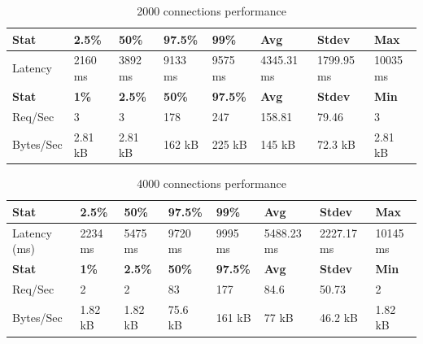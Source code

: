 \documentclass[../Main.tex]{subfiles}
\begin{document}
\begin{table}[H]
\centering
\begin{tabular}{|l|l|l|l|l|l|l|l|}
\hline
\rowcolor[HTML]{f56b00}
\textbf{Stat} & \textbf{2.5\%} & \textbf{50\%} & \textbf{97.5\%} & \textbf{99\%} & \textbf{Avg} & \textbf{Stdev} & \textbf{Max} \\ \hline
Latency & 2160 ms & 3892 ms & 9133 ms & 9575 ms & 4345.31 ms & 1799.95 ms & 10035 ms \\ \hline
\rowcolor[HTML]{f56b00}
\textbf{Stat} & \textbf{1\%} & \textbf{2.5\%} & \textbf{50\%} & \textbf{97.5\%} & \textbf{Avg} & \textbf{Stdev} & \textbf{Min} \\ \hline
Req/Sec & 3 & 3 & 178 & 247 & 158.81 & 79.46 & 3 \\ \hline
Bytes/Sec & 2.81 kB & 2.81 kB & 162 kB & 225 kB & 145 kB & 72.3 kB & 2.81 kB \\ \hline
\end{tabular}
 \caption{2000 connections performance}
 \label{2000-connections-performance}
\end{table}

\begin{table}[H]
  \centering
\begin{tabular}{|l|l|l|l|l|l|l|l|}
\hline
\rowcolor[HTML]{f56b00}
\textbf{Stat} & \textbf{2.5\%} & \textbf{50\%} & \textbf{97.5\%} & \textbf{99\%} & \textbf{Avg} & \textbf{Stdev} & \textbf{Max} \\ \hline
Latency (ms) & 2234 ms & 5475 ms & 9720 ms & 9995 ms & 5488.23 ms & 2227.17 ms & 10145 ms \\ \hline
\rowcolor[HTML]{f56b00}
\textbf{Stat} & \textbf{1\%} & \textbf{2.5\%} & \textbf{50\%} & \textbf{97.5\%} & \textbf{Avg} & \textbf{Stdev} & \textbf{Min} \\ \hline
Req/Sec & 2 & 2 & 83 & 177 & 84.6 & 50.73 & 2 \\ \hline
Bytes/Sec & 1.82 kB & 1.82 kB & 75.6 kB & 161 kB & 77 kB & 46.2 kB & 1.82 kB \\ \hline
\end{tabular}
 \caption{4000 connections performance}
 \label{4000-connections-performance}
\end{table}
\end{document}
